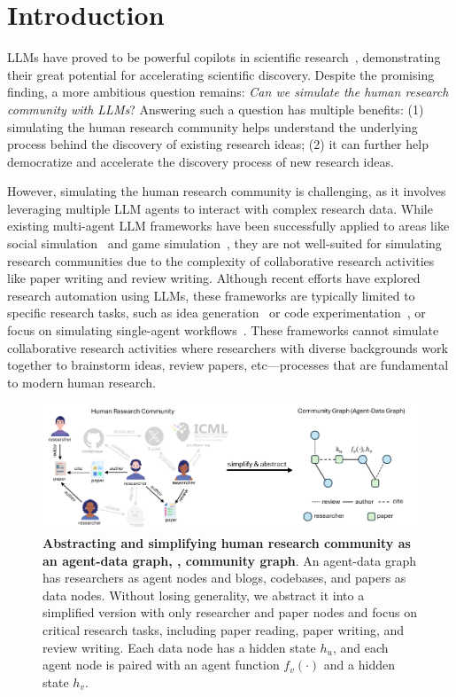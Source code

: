 
\section{Introduction}



LLMs have proved to be powerful copilots in scientific research~\citep{AI4Science2023TheIO}, demonstrating their great potential for accelerating scientific discovery.
Despite the promising finding, a more ambitious question remains: \textit{Can we simulate the human research community with LLMs}? Answering such a question has multiple benefits: (1) simulating the human research community helps understand the underlying process behind the discovery of existing research ideas; (2) it can further help democratize and accelerate the discovery process of new research ideas.

However, simulating the human research community is challenging, as it involves leveraging multiple LLM agents to interact with complex research data. While existing multi-agent LLM frameworks have been successfully applied to areas like social simulation~\citep{zhou2023sotopia,Gao2023S3SS} and game simulation~\citep{hua2023war,xu2023language}, they are not well-suited for simulating research communities due to the complexity of collaborative research activities like paper writing and review writing. Although recent efforts have explored research automation using LLMs, these frameworks are typically limited to specific research tasks, such as idea generation~\citep{girotra2023ideas, baek2024researchagent} or code experimentation~\citep{huang2024mlagentbench}, or focus on simulating single-agent workflows~\citep{lu2024ai}. These frameworks cannot simulate collaborative research activities where researchers with diverse backgrounds work together to brainstorm ideas, review papers, etc—processes that are fundamental to modern human research.

\begin{figure}[t]
    \centering
    \includegraphics[width=0.88\linewidth]{./figs/community_graph_definition.pdf}
    \caption{\textbf{Abstracting and simplifying human research community as an agent-data graph, \ie, community graph}. An agent-data graph has researchers as agent nodes and blogs, codebases, and papers as data nodes. Without losing generality, we abstract it into a simplified version with only researcher and paper nodes and focus on critical research tasks, including paper reading, paper writing, and review writing. Each data node has a hidden state $h_u$, and each agent node is paired with an agent function $f_v(\cdot)$ and a hidden state $h_v$.}
    \label{fig:community-graph}
    \vspace{-4mm}
\end{figure}

